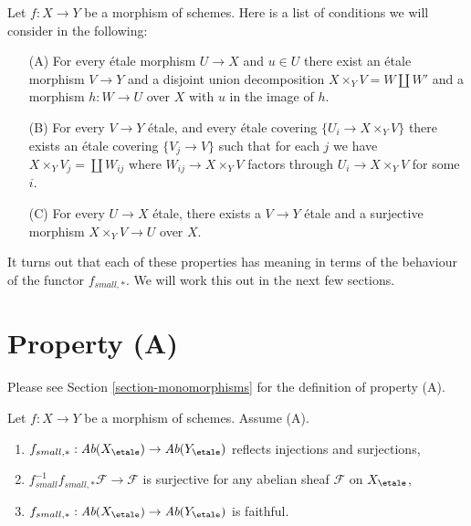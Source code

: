 \noindent
Let $f : X \to Y$ be a morphism of schemes.
Here is a list of conditions we will consider in the following:
\begin{enumerate}
\item[(A)] For every \'etale morphism $U \to X$ and $u \in U$ there exist
an \'etale morphism $V \to Y$ and a disjoint union decomposition
$X \times_Y V = W \amalg W'$ and a morphism $h : W \to U$ over $X$
with $u$ in the image of $h$.
\item[(B)] For every $V \to Y$ \'etale, and every \'etale covering
$\{U_i \to X \times_Y V\}$ there exists an \'etale covering
$\{V_j \to V\}$ such that for each $j$ we have
$X \times_Y V_j = \coprod W_{ij}$ where $W_{ij} \to X \times_Y V$
factors through $U_i \to X \times_Y V$ for some $i$.
\item[(C)] For every $U \to X$ \'etale, there exists a $V \to Y$ \'etale
and a surjective morphism $X \times_Y V \to U$ over $X$.
\end{enumerate}
It turns out that each of these properties has meaning in terms of
the behaviour of the functor $f_{small, *}$. We will work this
out in the next few sections.



\section{Property (A)}
\label{section-A}

\noindent
Please see Section \ref{section-monomorphisms} for the definition of property
(A).

\begin{lemma}
\label{lemma-property-A-implies}
Let $f : X \to Y$ be a morphism of schemes.
Assume (A).
\begin{enumerate}
\item
$f_{small, *} :
\textit{Ab}(X_\etale)
\to
\textit{Ab}(Y_\etale)$
reflects injections and surjections,
\item $f_{small}^{-1}f_{small, *}\mathcal{F} \to \mathcal{F}$
is surjective for any abelian sheaf $\mathcal{F}$ on $X_\etale$,
\item
$f_{small, *} :
\textit{Ab}(X_\etale)
\to
\textit{Ab}(Y_\etale)$
is faithful.
\end{enumerate}
\end{lemma}

